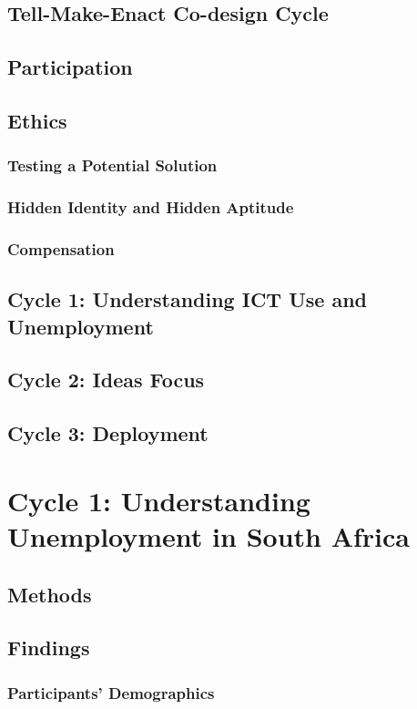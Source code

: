 \documentclass[12pt,a4paper]{report}
\begin{document}
\section{Tell-Make-Enact Co-design Cycle}
\section{Participation}
\section{Ethics}
\subsection{Testing a Potential Solution}
\subsection{Hidden Identity and Hidden Aptitude}
\subsection{Compensation}
\section{Cycle 1: Understanding ICT Use and Unemployment}
\section{Cycle 2: Ideas Focus}
\section{Cycle 3: Deployment}

\chapter{Cycle 1: Understanding Unemployment in South Africa}
\section{Methods}
\section{Findings}
\subsection{Participants’ Demographics}
\end{document}
